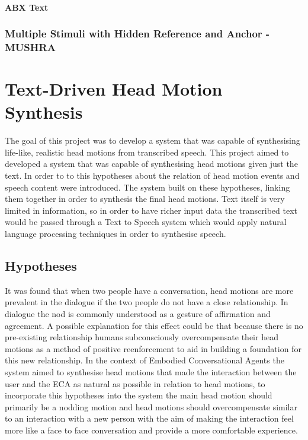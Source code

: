 \documentclass[bsc,frontabs,twoside,singlespacing,parskip]{infthesis}
\begin{document}
\subsubsection{ABX Text}

\subsection{Multiple Stimuli with Hidden Reference and Anchor - MUSHRA}

\cite{mushra}


\chapter{Text-Driven Head Motion Synthesis}

The goal of this project was to develop a system that was capable of synthesising life-like, realistic head motions from transcribed speech. This project aimed to developed a system that was capable of synthesising head motions given just the text. In order to to this hypotheses about the relation of head motion events and speech content were introduced. The system built on these hypotheses, linking them together in order to synthesis the final head motions. Text itself is very limited in information, so in order to have richer input data the transcribed text would be passed through a Text to Speech system which would apply natural language processing techniques in order to synthesise speech. 

\section{Hypotheses}

It was  found that when two people have a conversation, head motions are more prevalent in the dialogue if the two people do not have a close relationship. \cite{first_paper} In dialogue the nod is commonly understood as a gesture of affirmation and agreement. A possible explanation for this effect could be that because there is no pre-existing relationship humans subconsciously overcompensate their head motions as a method of positive reenforcement to aid in building a foundation for this new relationship. In the context of Embodied Conversational Agents the system aimed to synthesise head motions that made the interaction between the user and the ECA as natural as possible in relation to head motions, to incorporate this hypotheses into the system the main head motion should primarily be a nodding motion and head motions should overcompensate similar to an interaction with a new person with the aim of making the interaction feel more like a face to face conversation and provide a  more comfortable experience.
\end{document}
